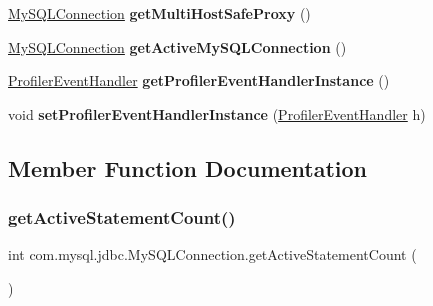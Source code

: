 \begin{DoxyCompactItemize}
\item 
\mbox{\label{interfacecom_1_1mysql_1_1jdbc_1_1_my_s_q_l_connection_a1029ea106dba3722bd5192821775b783}} 
\mbox{\hyperlink{interfacecom_1_1mysql_1_1jdbc_1_1_my_s_q_l_connection}{My\+S\+Q\+L\+Connection}} {\bfseries get\+Multi\+Host\+Safe\+Proxy} ()
\item 
\mbox{\label{interfacecom_1_1mysql_1_1jdbc_1_1_my_s_q_l_connection_a1f8e82785e08ed5c0640e399de43dad9}} 
\mbox{\hyperlink{interfacecom_1_1mysql_1_1jdbc_1_1_my_s_q_l_connection}{My\+S\+Q\+L\+Connection}} {\bfseries get\+Active\+My\+S\+Q\+L\+Connection} ()
\item 
\mbox{\label{interfacecom_1_1mysql_1_1jdbc_1_1_my_s_q_l_connection_aaee314726874af221bec0e45e99de417}} 
\mbox{\hyperlink{interfacecom_1_1mysql_1_1jdbc_1_1profiler_1_1_profiler_event_handler}{Profiler\+Event\+Handler}} {\bfseries get\+Profiler\+Event\+Handler\+Instance} ()
\item 
\mbox{\label{interfacecom_1_1mysql_1_1jdbc_1_1_my_s_q_l_connection_ac971c23d2d91d5f45dec5b16e88078d0}} 
void {\bfseries set\+Profiler\+Event\+Handler\+Instance} (\mbox{\hyperlink{interfacecom_1_1mysql_1_1jdbc_1_1profiler_1_1_profiler_event_handler}{Profiler\+Event\+Handler}} h)
\end{DoxyCompactItemize}


\subsection{Member Function Documentation}
\mbox{\label{interfacecom_1_1mysql_1_1jdbc_1_1_my_s_q_l_connection_aa42802b4debbacd9680e2ca0b70fd53d}} 
\subsubsection{\texorpdfstring{get\+Active\+Statement\+Count()}{getActiveStatementCount()}}
{\footnotesize\ttfamily int com.\+mysql.\+jdbc.\+My\+S\+Q\+L\+Connection.\+get\+Active\+Statement\+Count (\begin{DoxyParamCaption}{ }\end{DoxyParamCaption})}

